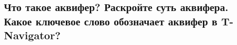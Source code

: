 

\subsection{Что такое аквифер? Раскройте суть аквифера. Какое ключевое слово обозначает аквифер в T-Navigator?}


